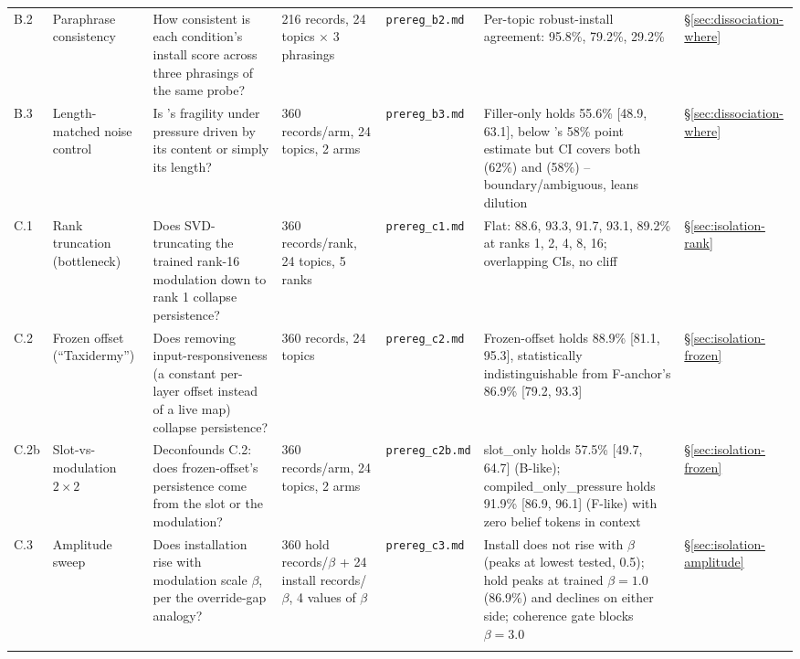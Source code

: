 \begin{longtable}{@{}p{}p{}p{}p{}p{}p{}p{}@{}}
\label{app:exp-b2}B.2 &
Paraphrase consistency &
How consistent is each condition's install score across three phrasings of the same
probe? &
216 records, 24 topics \(\times\) 3 phrasings &
\texttt{prereg\_b2.md} &
Per-topic robust-install agreement: \condB{} 95.8\%, \condF{} 79.2\%, \condC{} 29.2\% &
\S\ref{sec:dissociation-where} \\
\addlinespace

\label{app:exp-b3}B.3 &
Length-matched noise control &
Is \condB{}'s fragility under pressure driven by its content or simply its length? &
360 records/arm, 24 topics, 2 arms &
\texttt{prereg\_b3.md} &
Filler-only holds 55.6\% [48.9, 63.1], below \condB{}'s 58\% point estimate but CI
covers both \condA{} (62\%) and \condB{} (58\%) -- boundary/ambiguous, leans dilution &
\S\ref{sec:dissociation-where} \\
\addlinespace

\label{app:exp-c1}C.1 &
Rank truncation (bottleneck) &
Does SVD-truncating the trained rank-16 modulation down to rank 1 collapse
persistence? &
360 records/rank, 24 topics, 5 ranks &
\texttt{prereg\_c1.md} &
Flat: 88.6, 93.3, 91.7, 93.1, 89.2\% at ranks 1, 2, 4, 8, 16; overlapping CIs, no
cliff &
\S\ref{sec:isolation-rank} \\
\addlinespace

\label{app:exp-c2}C.2 &
Frozen offset (``Taxidermy'') &
Does removing input-responsiveness (a constant per-layer offset instead of a live
map) collapse persistence? &
360 records, 24 topics &
\texttt{prereg\_c2.md} &
Frozen-offset holds 88.9\% [81.1, 95.3], statistically indistinguishable from
F-anchor's 86.9\% [79.2, 93.3] &
\S\ref{sec:isolation-frozen} \\
\addlinespace

\label{app:exp-c2b}C.2b &
Slot-vs-modulation \(2\times2\) &
Deconfounds C.2: does frozen-offset's persistence come from the slot or the
modulation? &
360 records/arm, 24 topics, 2 arms &
\texttt{prereg\_c2b.md} &
slot\_only holds 57.5\% [49.7, 64.7] (B-like); compiled\_only\_pressure holds 91.9\%
[86.9, 96.1] (F-like) with zero belief tokens in context &
\S\ref{sec:isolation-frozen} \\
\addlinespace

\label{app:exp-c3}C.3 &
Amplitude sweep &
Does installation rise with modulation scale \(\beta\), per the override-gap
analogy? &
360 hold records/\(\beta\) + 24 install records/\(\beta\), 4 values of \(\beta\) &
\texttt{prereg\_c3.md} &
Install does not rise with \(\beta\) (peaks at lowest tested, 0.5); hold peaks at
trained \(\beta=1.0\) (86.9\%) and declines on either side; coherence gate blocks
\(\beta=3.0\) &
\S\ref{sec:isolation-amplitude} \\
\addlinespace


\end{longtable}
